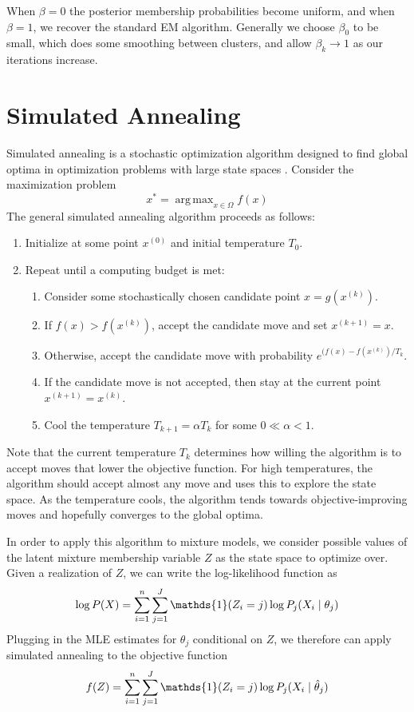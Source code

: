\documentclass{article}
\DeclareMathOperator*{\argmax}{arg\,max}
\newcommand*{\I}{\mathds{1}}
\newcommand*{\cond}{\;\ifnum\currentgrouptype=16 \middle\fi|\;}
\theoremstyle{definition}
\theoremstyle{algodesc}
\begin{document}
When $\beta = 0$ the posterior membership probabilities become uniform, and when $\beta = 1$, we recover the standard EM algorithm. Generally we choose $\beta_0$ to be small, which does some smoothing between clusters, and allow $\beta_k \to 1$ as our iterations increase.


\section{Simulated Annealing}

Simulated annealing is a stochastic optimization algorithm designed to find global optima in optimization problems with large state spaces \cite{kirkpatrickgelattvecchi83}. Consider the maximization problem
\begin{equation*}
x^* = \argmax_{x \in \Omega} f(x)
\end{equation*}
The general simulated annealing algorithm proceeds as follows:
\begin{enumerate}
\item Initialize at some point $x^{(0)}$ and initial temperature $T_0$.
\item Repeat until a computing budget is met:
  \begin{enumerate}
  \item Consider some stochastically chosen candidate point $x = g(x^{(k)})$.
  \item If $f(x) > f(x^{(k)})$, accept the candidate move and set $x^{(k+1)} = x$.
  \item Otherwise, accept the candidate move with probability $e^{(f(x) - f(x^{(k)})/T_k}$.
  \item If the candidate move is not accepted, then stay at the current point $x^{(k+1)} = x^{(k)}$.
  \item Cool the temperature $T_{k+1} = \alpha T_k$ for some $0 \ll \alpha < 1$.
  \end{enumerate}
\end{enumerate}

Note that the current temperature $T_k$ determines how willing the algorithm is to accept moves that lower the objective function. For high temperatures, the algorithm should accept almost any move and uses this to explore the state space. As the temperature cools, the algorithm tends towards objective-improving moves and hopefully converges to the global optima.

In order to apply this algorithm to mixture models, we consider possible values of the latent mixture membership variable $Z$ as the state space to optimize over. Given a realization of $Z$, we can write the log-likelihood function as
\begin{equation*}
\log P(X) = \sum_{i=1}^n \sum_{j=1}^J \I(Z_i = j) \log P_j(X_i \cond \theta_j)
\end{equation*}
Plugging in the MLE estimates for $\theta_j$ conditional on $Z$, we therefore can apply simulated annealing to the objective function
\begin{equation} \label{eq:sa_obj}
f(Z) = \sum_{i=1}^n \sum_{j=1}^J \I(Z_i = j) \log P_j(X_i \cond \hat{\theta}_j)
\end{equation}
\end{document}
